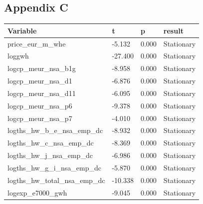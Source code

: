 \documentclass[12pt]{article}
\begin{document}
\subsection{Appendix C}
\begin{tabular}{ p{6.2cm} p{2cm} p{2cm} p{2cm} }

  \hline
Variable&t&p&result\\
 \hline
 price\_eur\_m\_whe&-5.132&0.000&Stationary\\
 loggwh&-27.400&0.000&Stationary\\
logcp\_meur\_nsa\_b1g&-8.958&0.000&Stationary\\
logcp\_meur\_nsa\_d1&-6.876&0.000&Stationary\\
logcp\_meur\_nsa\_d11&-6.095&0.000&Stationary\\
logcp\_meur\_nsa\_p6&-9.378&0.000&Stationary\\
logcp\_meur\_nsa\_p7&-4.010&0.000&Stationary\\
logths\_hw\_b\_e\_nsa\_emp\_dc&-8.932&0.000&Stationary\\
logths\_hw\_c\_nsa\_emp\_dc&-8.369&0.000&Stationary\\
logths\_hw\_j\_nsa\_emp\_dc&-6.986&0.000&Stationary\\
logths\_hw\_g\_i\_nsa\_emp\_dc&-5.870&0.000&Stationary\\
logths\_hw\_total\_nsa\_emp\_dc&-10.338&0.000&Stationary\\
logexp\_e7000\_gwh&-9.045&0.000&Stationary\\
 \hline
\end{tabular}
\end{document}
